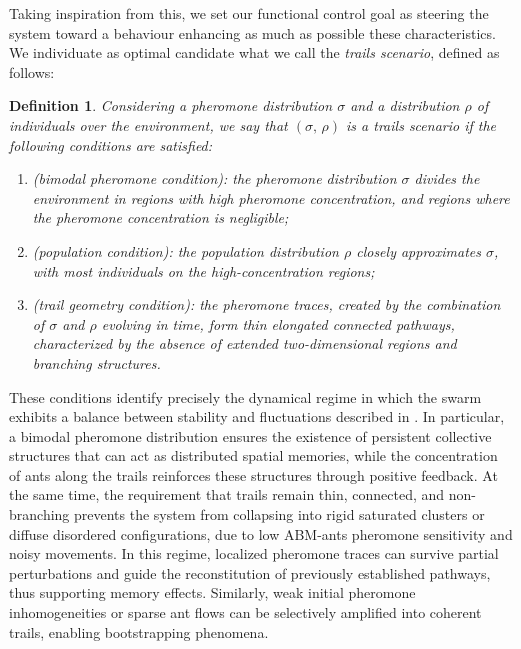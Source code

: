 \documentclass[openacc]{rsproca_new}
\newtheorem{definition}{\bf Definition}[section]
\begin{document}
Taking inspiration from this, we set our functional control goal as steering the system toward a behaviour enhancing as much as possible these characteristics. We individuate as optimal candidate what we call the \emph{trails scenario}, defined as follows:
\begin{definition}
\label{def:ants-trail-scenario}
Considering a pheromone distribution $\sigma$ and a distribution $\rho$ of individuals over the environment, we say that $(\sigma, \, \rho)$ is a \emph{trails scenario} if the following conditions are satisfied:
\begin{enumerate}
    \item (\textit{bimodal pheromone condition}): the pheromone distribution $\sigma$ divides the environment in regions with high pheromone concentration, and regions where the pheromone concentration is negligible;

    \item (\textit{population condition}): the population distribution $\rho$ closely approximates $\sigma$, with most individuals on the high-concentration regions;

    \item (\textit{trail geometry condition}): the pheromone traces, created by the combination of $\sigma$ and $\rho$ evolving in time, form thin elongated connected pathways, characterized by the absence of extended two-dimensional regions and branching structures.
\end{enumerate}
\end{definition}
These conditions identify precisely the dynamical regime in which the swarm exhibits a balance between stability and fluctuations described in \cite{patternformation}. In particular, a bimodal pheromone distribution ensures the existence of persistent collective structures that can act as distributed spatial memories, while the concentration of ants along the trails reinforces these structures through positive feedback. At the same time, the requirement that trails remain thin, connected, and non-branching prevents the system from collapsing into rigid saturated clusters or diffuse disordered configurations, due to low ABM-ants pheromone sensitivity and noisy movements. In this regime, localized pheromone traces can survive partial perturbations and guide the reconstitution of previously established pathways, thus supporting memory effects. Similarly, weak initial pheromone inhomogeneities or sparse ant flows can be selectively amplified into coherent trails, enabling bootstrapping phenomena. 
\end{document}
